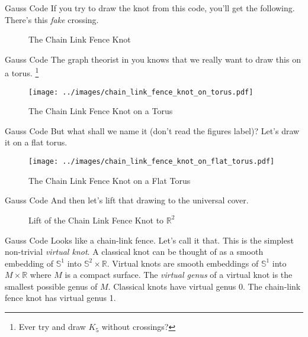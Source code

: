 \documentclass{beamer}
\begin{document}
    \begin{frame}{Gauss Code}
        If you try to draw the knot from this code, you'll get the following.
        There's this \textit{fake} crossing.
        \begin{figure}
            \centering
            \caption{The Chain Link Fence Knot}
            \label{fig:chain_link_fence_knot}
        \end{figure}
    \end{frame}
    \begin{frame}{Gauss Code}
        The graph theorist in you knows that we really want to draw this on a
        torus.%
        \footnote{Ever try and draw $K_{5}$ without crossings?}
        \begin{figure}
            \centering
            \texttt{[image: ../images/chain\_link\_fence\_knot\_on\_torus.pdf]}
            \caption{The Chain Link Fence Knot on a Torus}
            \label{fig:chain_link_fence_knot_on_torus}
        \end{figure}
    \end{frame}
    \begin{frame}{Gauss Code}
        But what shall we name it (don't read the figures label)?
        Let's draw it on a flat torus.
        \begin{figure}
            \centering
            \texttt{[image: ../images/chain\_link\_fence\_knot\_on\_flat\_torus.pdf]}
            \caption{The Chain Link Fence Knot on a Flat Torus}
            \label{fig:chain_link_fence_knot_on_flat_torus}
        \end{figure}
    \end{frame}
    \begin{frame}{Gauss Code}
        And then let's lift that drawing to the universal cover.
        \begin{figure}
            \centering
            \caption{Lift of the Chain Link Fence Knot to $\mathbb{R}^{2}$}
            \label{fig:chain_link_fence_knot_on_flat_torus_universal_cover}
        \end{figure}
    \end{frame}
    \begin{frame}{Gauss Code}
        Looks like a chain-link fence. Let's call it that. This is the simplest
        non-trivial \textit{virtual knot}. A classical knot can be thought of
        as a smooth embedding of $\mathbb{S}^{1}$ into
        $\mathbb{S}^{2}\times\mathbb{R}$. Virtual knots are smooth embeddings
        of $\mathbb{S}^{1}$ into $M\times\mathbb{R}$ where $M$ is a compact
        surface. The \textit{virtual genus} of a virtual knot is the smallest
        possible genus of $M$. Classical knots have virtual genus 0. The
        chain-link fence knot has virtual genus 1.
    \end{frame}
\end{document}
